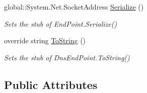 \begin{DoxyCompactItemize}
global\-::\-System.\-Net.\-Socket\-Address \hyperlink{class_system_1_1_net_1_1_fakes_1_1_stub_dns_end_point_a4b08c335ecc1617ce45b89f31632fead}{Serialize} ()
\begin{DoxyCompactList}\small\item\em Sets the stub of End\-Point.\-Serialize()\end{DoxyCompactList}\item 
override string \hyperlink{class_system_1_1_net_1_1_fakes_1_1_stub_dns_end_point_a42c67411069ed3e938b49d702a886438}{To\-String} ()
\begin{DoxyCompactList}\small\item\em Sets the stub of Dns\-End\-Point.\-To\-String()\end{DoxyCompactList}\end{DoxyCompactItemize}
\subsection*{Public Attributes}
